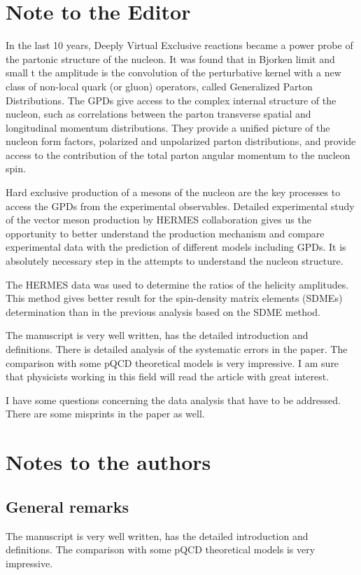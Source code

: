 \documentclass{article}
\begin{document}
\section{Note to the Editor}
In the last 10 years, Deeply Virtual Exclusive reactions became a power probe of the partonic structure of the nucleon. It was found that in Bjorken limit and small t the amplitude is the convolution of the perturbative kernel with a new class of non-local quark (or gluon) operators, called Generalized Parton Distributions. The GPDs give access to the complex internal structure of the nucleon, such as correlations between the parton transverse spatial and longitudinal momentum distributions. They provide a unified picture of the nucleon form factors, polarized  and unpolarized parton distributions, and provide access to the contribution of the total parton angular momentum  to the nucleon spin.
  
Hard exclusive production of a mesons of the nucleon are the key processes to access  the GPDs from the experimental observables.  
Detailed experimental study of the vector meson production by HERMES collaboration gives us the opportunity
to better understand the production mechanism and compare experimental data with the prediction of different models including GPDs. It is absolutely necessary step in the attempts to understand the nucleon structure.

The HERMES data was used to determine the ratios of the helicity amplitudes. This method gives
better result for the spin-density matrix elements (SDMEs) determination than in the previous analysis based on the SDME method.

The manuscript is very well written, has the detailed introduction and definitions. 
There is detailed analysis of the systematic errors in the paper.
The comparison with some pQCD theoretical models is very impressive. I am sure that physicists  working in this field will read the article with great interest.

I have some questions concerning the data analysis that have to be addressed. There are some misprints in the paper as well.


\section{Notes to the authors}
\subsection{General remarks}
The manuscript is very well written, has the detailed introduction and definitions. 
The comparison with some pQCD theoretical models is very impressive. 
\end{document}
